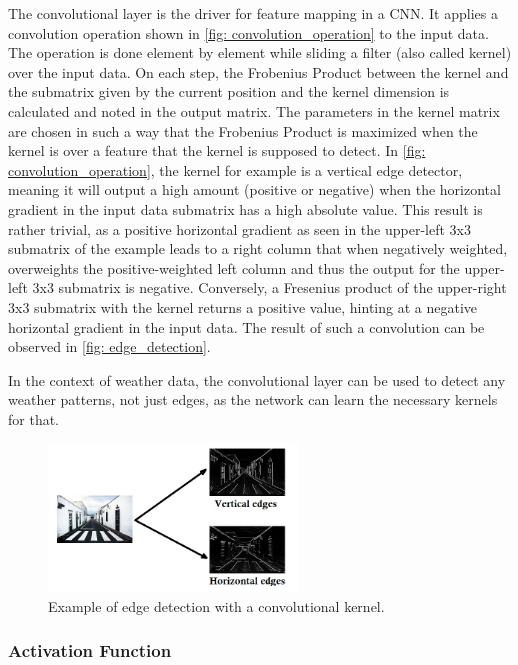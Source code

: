 The convolutional layer is the driver for feature mapping in a CNN. It applies a convolution operation shown in \autoref{fig: convolution_operation} to the input data. The operation is done element by element while sliding a filter (also called kernel) over the input data. On each step, the Frobenius Product between the kernel and the submatrix given by the current position and the kernel dimension is calculated and noted in the output matrix. The parameters in the kernel matrix are chosen in such a way that the Frobenius Product is maximized when the kernel is over a feature that the kernel is supposed to detect. In \autoref{fig: convolution_operation}, the kernel for example is a vertical edge detector, meaning it will output a high amount (positive or negative) when the horizontal gradient in the input data submatrix has a high absolute value. This result is rather trivial, as a positive horizontal gradient as seen in the upper-left 3x3 submatrix of the example leads to a right column that when negatively weighted, overweights the positive-weighted left column and thus the output for the upper-left 3x3 submatrix is negative. Conversely, a Fresenius product of the upper-right 3x3 submatrix with the kernel returns a positive value, hinting at a negative horizontal gradient in the input data. The result of such a convolution can be observed in \autoref{fig: edge_detection}.

In the context of weather data, the convolutional layer can be used to detect any weather patterns, not just edges, as the network can learn the necessary kernels for that.

\begin{figure}
    \centering
    \includegraphics[width=250px]{resources/images/edge_detection.jpeg}
    \caption{Example of edge detection with a convolutional kernel.}
    \label{fig: edge_detection}
\end{figure}

\subsubsection*{Activation Function}


